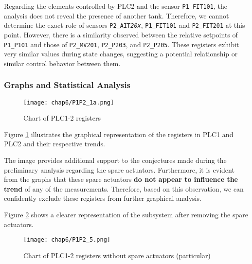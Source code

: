 \bigskip
Regarding the elements controlled by PLC2 and the sensor \texttt{P1\_FIT101}, the analysis does not reveal the presence of another tank. Therefore, we cannot determine the exact role of sensors \texttt{P2\_AIT\textit{20x}}, \texttt{P1\_FIT101} and \texttt{P2\_FIT201} at this point.
However, there is a similarity observed between the relative setpoints of \texttt{P1\_P101} and those of \texttt{P2\_MV201}, \texttt{P2\_P203}, and \texttt{P2\_P205}. These registers exhibit very similar values during state changes, suggesting a potential relationship or similar control behavior between them.

\subsubsection{Graphs and Statistical Analysis}
\label{subsubsec:6_P1P2_graphs}

\begin{figure}[ht]
	\centering
	\texttt{[image: chap6/P1P2\_1a.png]}
	\caption{Chart of PLC1-2 registers}
	\label{fig:6_P1P2_graph_full}
\end{figure}

Figure \ref{fig:6_P1P2_graph_full} illustrates the graphical representation of the registers in PLC1 and PLC2 and their respective trends.

The image provides additional support to the conjectures made during the preliminary analysis regarding the spare actuators. Furthermore, it is evident from the graphs that these spare actuators \textbf{do not appear to influence the trend} of any of the measurements. Therefore, based on this observation, we can confidently exclude these registers from further graphical analysis.

\bigskip
Figure \ref{fig:6_P1P2_graph_full_nospare} shows a clearer representation of the subsystem after removing the spare actuators.

\begin{figure}[ht]
	\centering
	\texttt{[image: chap6/P1P2\_5.png]}
	\caption{Chart of PLC1-2 registers without spare actuators (particular)}
	\label{fig:6_P1P2_graph_full_nospare}
\end{figure}

